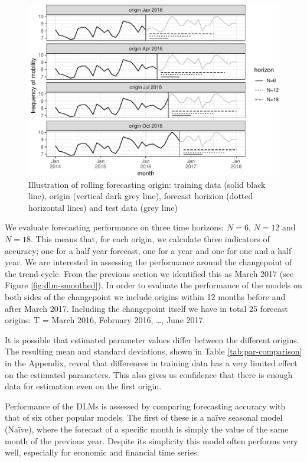 \documentclass[12pt, a4paper]{article}
\begin{document}
\begin{figure}[H]
  \caption{\label{fig:rolling-forecast-example}Illustration of rolling
forecasting origin: training data (solid black line), origin (vertical
dark grey line), forecast horizion (dotted horizontal lines) and test
data (grey line)}
\centering
\includegraphics[scale = 0.8]{../figs/freq--rolling-forecast-example-1.pdf}

\end{figure}

We evaluate forecasting performance on three time horizons: $N=6$,
$N=12$ and $N=18$. This means that, for each origin, we calculate
three indicators of accuracy; one for a half year forecast, one for a
year and one for one and a half year. We are interested in assessing the
performance around the changepoint of the trend-cycle. From the previous
section we identified this as March 2017 (see Figure
\ref{fig:dlm-smoothed}). In order to evaluate the performance of the
models on both sides of the changepoint we include origins within 12
months before and after March 2017. Including the changepoint itself we
have in total 25 forecast origins: T = March 2016, February 2016,
\ldots{}, June 2017.

It is possible that estimated parameter values differ
between the different origins. The resulting mean and standard
deviations, shown in Table \ref{tab:par-comparison} in the Appendix,
reveal that differences in training data has a very limited effect on
the estimated parameters. This also gives us confidence that there is
enough data for estimation even on the first origin.

Performance of the DLMs is assessed by comparing forecasting accuracy
with that of six other popular models. The first of these is a naïve
seasonal model (Naïve), where the forecast of a specific month is simply
the value of the same month of the previous year. Despite its simplicity
this model often performs very well, especially for economic and financial time series.
\end{document}
